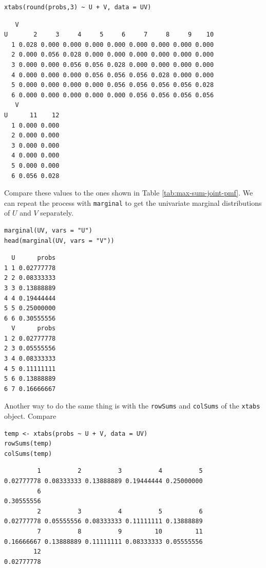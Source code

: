 \documentclass[captions=tableheading]{scrbook}
\begin{document}
\begin{verbatim}
xtabs(round(probs,3) ~ U + V, data = UV)
\end{verbatim}


\begin{verbatim}
   V
U       2     3     4     5     6     7     8     9    10
  1 0.028 0.000 0.000 0.000 0.000 0.000 0.000 0.000 0.000
  2 0.000 0.056 0.028 0.000 0.000 0.000 0.000 0.000 0.000
  3 0.000 0.000 0.056 0.056 0.028 0.000 0.000 0.000 0.000
  4 0.000 0.000 0.000 0.056 0.056 0.056 0.028 0.000 0.000
  5 0.000 0.000 0.000 0.000 0.056 0.056 0.056 0.056 0.028
  6 0.000 0.000 0.000 0.000 0.000 0.056 0.056 0.056 0.056
   V
U      11    12
  1 0.000 0.000
  2 0.000 0.000
  3 0.000 0.000
  4 0.000 0.000
  5 0.000 0.000
  6 0.056 0.028
\end{verbatim}

Compare these values to the ones shown in Table \ref{tab:max-sum-joint-pmf}. We can repeat the process with \texttt{marginal} to get the univariate marginal distributions of \(U\) and \(V\) separately.


\begin{verbatim}
marginal(UV, vars = "U")
head(marginal(UV, vars = "V"))
\end{verbatim}


\begin{verbatim}
  U      probs
1 1 0.02777778
2 2 0.08333333
3 3 0.13888889
4 4 0.19444444
5 5 0.25000000
6 6 0.30555556
  V      probs
1 2 0.02777778
2 3 0.05555556
3 4 0.08333333
4 5 0.11111111
5 6 0.13888889
6 7 0.16666667
\end{verbatim}

Another way to do the same thing is with the \texttt{rowSums} and \texttt{colSums} of the \texttt{xtabs} object. Compare


\begin{verbatim}
temp <- xtabs(probs ~ U + V, data = UV)
rowSums(temp)
colSums(temp)
\end{verbatim}


\begin{verbatim}
         1          2          3          4          5 
0.02777778 0.08333333 0.13888889 0.19444444 0.25000000 
         6 
0.30555556
         2          3          4          5          6 
0.02777778 0.05555556 0.08333333 0.11111111 0.13888889 
         7          8          9         10         11 
0.16666667 0.13888889 0.11111111 0.08333333 0.05555556 
        12 
0.02777778
\end{verbatim}
\end{document}
